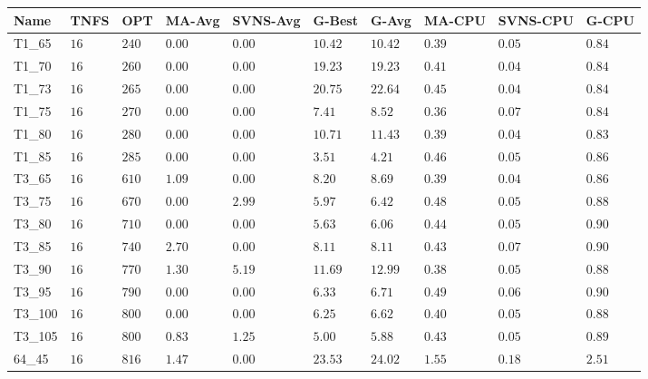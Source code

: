\begin{center}
\begin{table}[]
\centering
\begin{tabular}{|lll|l|l|ll|lll|}
\hline
Name     & TNFS   & OPT    & MA-Avg   &SVNS-Avg& G-Best  & G-Avg   & MA-CPU   & SVNS-CPU   & G-CPU \\
\hline
T1\_65   & $16  $ & $240 $ & $\bm{0.00}  $ & $\bm{0.00}$ & $10.42$ & $10.42$ & $0.39  $ & $0.05    $ & $0.84     $ \\
T1\_70   & $16  $ & $260 $ & $\bm{0.00}  $ & $\bm{0.00}$ & $19.23$ & $19.23$ & $0.41  $ & $0.04    $ & $0.84     $ \\
T1\_73   & $16  $ & $265 $ & $\bm{0.00}  $ & $\bm{0.00}$ & $20.75$ & $22.64$ & $0.45  $ & $0.04    $ & $0.84     $ \\
T1\_75   & $16  $ & $270 $ & $\bm{0.00}  $ & $\bm{0.00}$ & $7.41 $ & $8.52 $ & $0.36  $ & $0.07    $ & $0.84     $ \\
T1\_80   & $16  $ & $280 $ & $\bm{0.00}  $ & $\bm{0.00}$ & $10.71$ & $11.43$ & $0.39  $ & $0.04    $ & $0.83     $ \\
T1\_85   & $16  $ & $285 $ & $\bm{0.00}  $ & $\bm{0.00}$ & $3.51 $ & $4.21 $ & $0.46  $ & $0.05    $ & $0.86     $ \\
\hline
T3\_65   & $16  $ & $610 $ & $1.09  $ & $\bm{0.00}$ & $8.20 $ & $8.69 $ & $0.39  $ & $0.04    $ & $0.86     $ \\
T3\_75   & $16  $ & $670 $ & $\bm{0.00}  $ & $2.99$ & $5.97 $ & $6.42 $ & $0.48  $ & $0.05    $ & $0.88     $ \\
T3\_80   & $16  $ & $710 $ & $\bm{0.00}  $ & $\bm{0.00}$ & $5.63 $ & $6.06 $ & $0.44  $ & $0.05    $ & $0.90     $ \\
T3\_85   & $16  $ & $740 $ & $2.70  $ & $\bm{0.00}$ & $8.11 $ & $8.11 $ & $0.43  $ & $0.07    $ & $0.90     $ \\
T3\_90   & $16  $ & $770 $ & $1.30  $ & $5.19$ & $11.69$ & $12.99$ & $0.38  $ & $0.05    $ & $0.88     $ \\
T3\_95   & $16  $ & $790 $ & $\bm{0.00}  $ & $\bm{0.00}$ & $6.33 $ & $6.71 $ & $0.49  $ & $0.06    $ & $0.90     $ \\
T3\_100  & $16  $ & $800 $ & $\bm{0.00}  $ & $\bm{0.00}$ & $6.25 $ & $6.62 $ & $0.40  $ & $0.05    $ & $0.88     $ \\
T3\_105  & $16  $ & $800 $ & $0.83  $ & $1.25$ & $5.00 $ & $5.88 $ & $0.43  $ & $0.05    $ & $0.89     $ \\
\hline
64\_45   & $16  $ & $816 $ & $1.47  $ & $\bm{0.00}$ & $23.53$ & $24.02$ & $1.55  $ & $0.18    $ & $2.51     $ \\

\end{tabular}
\end{table}
\end{center}
